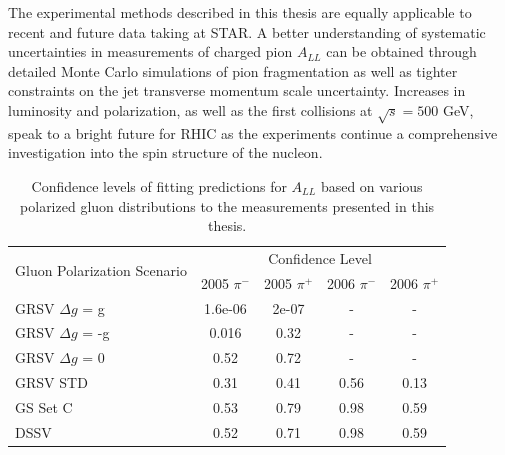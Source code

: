 The experimental methods described in this thesis are equally applicable to recent and future data taking at STAR.  A better understanding of systematic uncertainties in measurements of charged pion \(A_{LL}\) can be obtained through detailed Monte Carlo simulations of pion fragmentation as well as tighter constraints on the jet transverse momentum scale uncertainty.  Increases in luminosity and  polarization, as well as the first collisions at \(\sqrt{s} = 500\) GeV, speak to a bright future for RHIC as the experiments continue a comprehensive investigation into the spin structure of the nucleon.

\begin{table}
  \centering
  \begin{tabular}{|l||c|c|c|c|}
    \hline
    \multirow{2}{*}{Gluon Polarization Scenario} & \multicolumn{4}{c|}{Confidence Level} \\
    \cline{2-5}
    & 2005 $\pi^-$ & 2005 $\pi^+$ & 2006 $\pi^-$ & 2006 $\pi^+$ \\
    \hline
    GRSV $\Delta g$ = g & 1.6e-06 & 2e-07 & - & - \\
    GRSV $\Delta g$ = -g & 0.016 & 0.32 & - & - \\
    GRSV $\Delta g$ = 0 & 0.52 & 0.72 & - & - \\
    GRSV STD & 0.31 & 0.41 & 0.56 & 0.13 \\
    GS Set C & 0.53 & 0.79 & 0.98 & 0.59 \\
    DSSV & 0.52 & 0.71 & 0.98 & 0.59 \\
    \hline
  \end{tabular}
  \caption{Confidence levels of fitting predictions for $A_{LL}$ based on various polarized gluon distributions to the measurements presented in this thesis.}
  \label{tab:confidence-levels}
\end{table}
